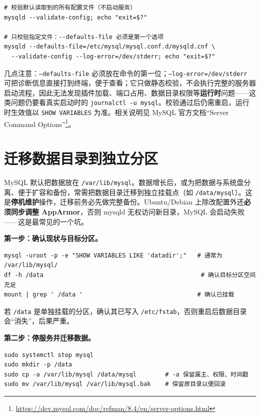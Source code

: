 \documentclass[12pt,UTF8]{ctexbook}
\begin{document}
\begin{lstlisting}
# 校验默认读取到的所有配置文件（不启动服务）
mysqld --validate-config; echo "exit=$?"

# 只校验指定文件：--defaults-file 必须是第一个选项
mysqld --defaults-file=/etc/mysql/mysql.conf.d/mysqld.cnf \
  --validate-config --log-error=/dev/stderr; echo "exit=$?"
\end{lstlisting}

几点注意：\texttt{--defaults-file} 必须放在命令的第一位；\texttt{--log-error=/dev/stderr} 可把诊断信息直接打到终端，便于查看；它只做静态校验，不会执行完整的服务器启动流程，因此无法发现插件加载、端口占用、数据目录权限等\textbf{运行时}问题——这类问题仍要看真实启动时的 \verb|journalctl -u mysql|。校验通过后仍需重启，运行时生效值以 \texttt{SHOW VARIABLES} 为准。相关说明见 MySQL 官方文档“Server Command Options”\footnote{\url{https://dev.mysql.com/doc/refman/8.4/en/server-options.html}}。

\section{迁移数据目录到独立分区}
\label{sec:move-datadir}

MySQL 默认把数据放在 \texttt{/var/lib/mysql}。数据增长后，或为把数据与系统盘分离、便于扩容和备份，常需把数据目录迁移到独立挂载点（如 \texttt{/data/mysql}）。这是\textbf{停机维护}操作，迁移前务必先做完整备份。Ubuntu/Debian 上除改配置外还\textbf{必须同步调整 AppArmor}，否则 mysqld 无权访问新目录，MySQL 会启动失败——这是最常见的一个坑。

\textbf{第一步：确认现状与目标分区。}

\begin{lstlisting}
mysql -uroot -p -e "SHOW VARIABLES LIKE 'datadir';"   # 通常为 /var/lib/mysql/
df -h /data                                            # 确认目标分区空间充足
mount | grep ' /data '                                # 确认已挂载
\end{lstlisting}

若 \texttt{/data} 是单独挂载的分区，确认其已写入 \texttt{/etc/fstab}，否则重启后数据目录会“消失”，后果严重。

\textbf{第二步：停服务并迁移数据。}

\begin{lstlisting}
sudo systemctl stop mysql
sudo mkdir -p /data
sudo cp -a /var/lib/mysql /data/mysql        # -a 保留属主、权限、时间戳
sudo mv /var/lib/mysql /var/lib/mysql.bak    # 保留原目录以便回滚
\end{lstlisting}
\end{document}
